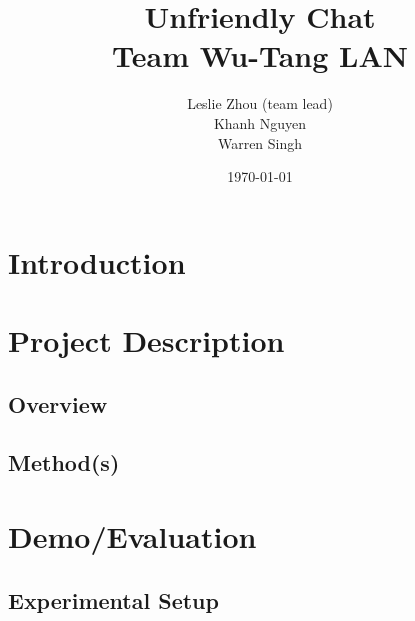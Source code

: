 \documentclass[12pt]{article}
\title{%
    Unfriendly Chat\\
    \large Team Wu-Tang LAN}
\author{Leslie Zhou (team lead)\\ Khanh Nguyen \\ Warren Singh}
\date{\today}
\begin{document}
\maketitle

\newpage
\tableofcontents
\newpage

\section{Introduction}
\par %
\par %
\par %
\par%

\newpage
\section{Project Description}

\subsection{Overview}
\par  %

\subsection{Method(s)}
\par %

\newpage
\section{Demo/Evaluation}
\subsection{Experimental Setup}
\par %
\end{document}
